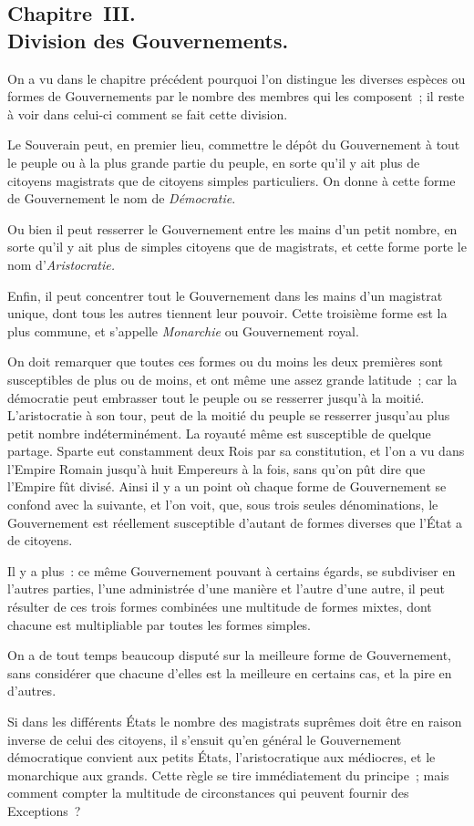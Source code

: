 \documentclass[french,twoside]{book} %
\begin{document}
\subsection[{Chapitre III. Division des Gouvernements.}]{Chapitre III. \\
Division des Gouvernements.}
\noindent On a vu dans le chapitre précédent pourquoi l’on distingue les diverses espèces ou formes de Gouvernements par le nombre des membres qui les composent ; il reste à voir dans celui-ci comment se fait cette division.\par
Le Souverain peut, en premier lieu, commettre le dépôt du Gouvernement à tout le peuple ou à la plus grande partie du peuple, en sorte qu’il y ait plus de citoyens magistrats que de citoyens simples particuliers. On donne à cette forme de Gouvernement le nom de {\itshape Démocratie}.\par
Ou bien il peut resserrer le Gouvernement entre les mains d’un petit nombre, en sorte qu’il y ait plus de simples citoyens que de magistrats, et cette forme porte le nom d’{\itshape Aristocratie.}\par
Enfin, il peut concentrer tout le Gouvernement dans les mains d’un magistrat unique, dont tous les autres tiennent leur pouvoir. Cette troisième forme est la plus commune, et s’appelle {\itshape Monarchie} ou Gouvernement royal.\par
On doit remarquer que toutes ces formes ou du moins les deux premières sont susceptibles de plus ou de moins, et ont même une assez grande latitude ; car la démocratie peut embrasser tout le peuple ou se resserrer jusqu’à la moitié. L’aristocratie à son tour, peut de la moitié du peuple se resserrer jusqu’au plus petit nombre indéterminément. La royauté même est susceptible de quelque partage. Sparte eut constamment deux Rois par sa constitution, et l’on a vu dans l’Empire Romain jusqu’à huit Empereurs à la fois, sans qu’on pût dire que l’Empire fût divisé. Ainsi il y a un point où chaque forme de Gouvernement se confond avec la suivante, et l’on voit, que, sous trois seules dénominations, le Gouvernement est réellement susceptible d’autant de formes diverses que l’État a de citoyens.\par
Il y a plus : ce même Gouvernement pouvant à certains égards, se subdiviser en l’autres parties, l’une administrée d’une manière et l’autre d’une autre, il peut résulter de ces trois formes combinées une multitude de formes mixtes, dont chacune est multipliable par toutes les formes simples.\par
On a de tout temps beaucoup disputé sur la meilleure forme de Gouvernement, sans considérer que chacune d’elles est la meilleure en certains cas, et la pire en d’autres.\par
Si dans les différents États le nombre des magistrats suprêmes doit être en raison inverse de celui des citoyens, il s’ensuit qu’en général le Gouvernement démocratique convient aux petits États, l’aristocratique aux médiocres, et le monarchique aux grands. Cette règle se tire immédiatement du principe ; mais comment compter la multitude de circonstances qui peuvent fournir des Exceptions ?
\end{document}
